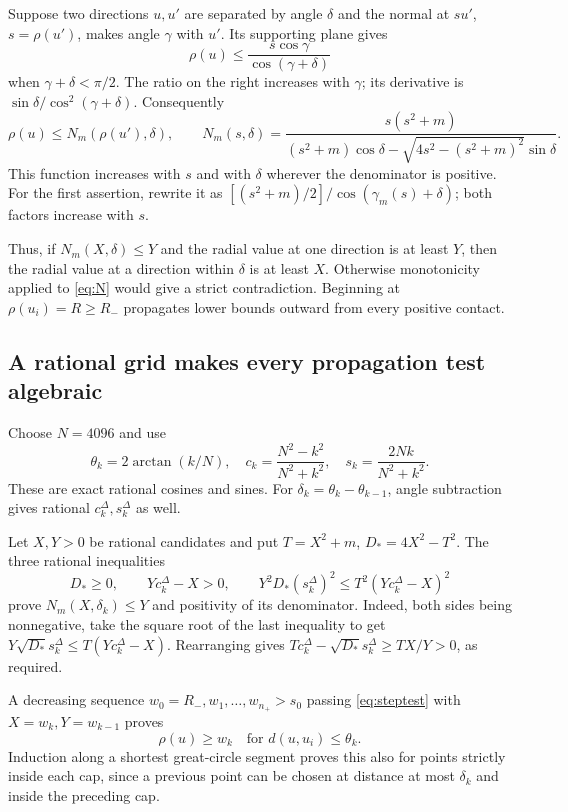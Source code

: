 \documentclass[11pt]{article}
\numberwithin{equation}{section}
\theoremstyle{definition}\newtheorem{definition}[theorem]{Definition}
\theoremstyle{remark}\newtheorem{remark}[theorem]{Remark}
\begin{document}
Suppose two directions $u,u'$ are separated by angle $\delta$ and the normal
at $s u'$, $s=\rho(u')$, makes angle $\gamma$ with $u'$. Its supporting plane
gives
\[
 \rho(u)\le\frac{s\cos\gamma}{\cos(\gamma+\delta)}
\]
when $\gamma+\delta<\pi/2$. The ratio on the right increases with $\gamma$;
its derivative is $\sin\delta/\cos^2(\gamma+\delta)$. Consequently
\begin{equation}\label{eq:N}
 \rho(u)\le N_m(\rho(u'),\delta),\qquad
 N_m(s,\delta)=\frac{s(s^2+m)}{(s^2+m)\cos\delta
 -\sqrt{4s^2-(s^2+m)^2}\sin\delta}.
\end{equation}
This function increases with $s$ and with $\delta$ wherever the denominator
is positive. For the first assertion, rewrite it as
$[(s^2+m)/2]/\cos(\gamma_m(s)+\delta)$; both factors increase with $s$.

Thus, if $N_m(X,\delta)\le Y$ and the radial value at one direction is at
least $Y$, then the radial value at a direction within $\delta$ is at least
$X$. Otherwise monotonicity applied to \cref{eq:N} would give a strict
contradiction. Beginning at $\rho(u_i)=R\ge R_-$ propagates lower bounds
outward from every positive contact.

\subsection{A rational grid makes every propagation test algebraic}
Choose $N=4096$ and use
\begin{equation}\label{eq:anglesgrid}
 \theta_k=2\arctan(k/N),\quad
 c_k=\frac{N^2-k^2}{N^2+k^2},\quad s_k=\frac{2Nk}{N^2+k^2}.
\end{equation}
These are exact rational cosines and sines. For
$\delta_k=\theta_k-\theta_{k-1}$, angle subtraction gives rational
$c_k^\Delta,s_k^\Delta$ as well.

Let $X,Y>0$ be rational candidates and put $T=X^2+m$,
$D_*=4X^2-T^2$. The three rational inequalities
\begin{equation}\label{eq:steptest}
 D_*\ge0,\qquad Yc_k^\Delta-X>0,\qquad
 Y^2D_*(s_k^\Delta)^2\le T^2(Yc_k^\Delta-X)^2
\end{equation}
prove $N_m(X,\delta_k)\le Y$ and positivity of its denominator.
Indeed, both sides being nonnegative, take the square root of the last
inequality to get
$Y\sqrt{D_*}s_k^\Delta\le T(Yc_k^\Delta-X)$.
Rearranging gives
$T c_k^\Delta-\sqrt{D_*}s_k^\Delta\ge TX/Y>0$, as required.

A decreasing sequence $w_0=R_-,w_1,\ldots,w_{n_+}>s_0$ passing
\cref{eq:steptest} with $X=w_k,Y=w_{k-1}$ proves
\begin{equation}\label{eq:positivecert}
 \rho(u)\ge w_k\quad\text{for }d(u,u_i)\le\theta_k.
\end{equation}
Induction along a shortest great-circle segment proves this also for points
strictly inside each cap, since a previous point can be chosen at distance
at most $\delta_k$ and inside the preceding cap.
\end{document}
